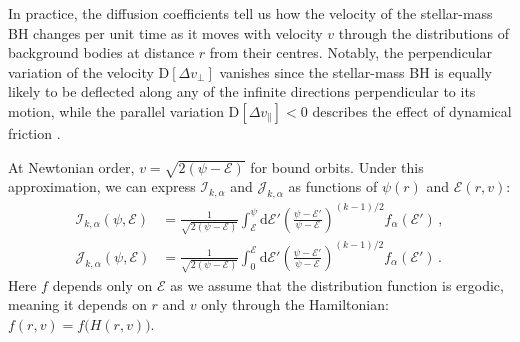 \documentclass[desactivate]{aa}
\begin{document}
\begin{appendix}
    In practice, the diffusion coefficients tell us how the velocity of the stellar-mass BH changes per unit time as it moves with velocity $v$ through the distributions of background bodies at distance $r$ from their centres. Notably, the perpendicular variation of the velocity $\mathrm{D}\left[\Delta v_\perp\right]$ vanishes since the stellar-mass BH is equally likely to be deflected along any of the infinite directions perpendicular to its motion, while the parallel variation $\mathrm{D}\left[\Delta v_\parallel\right] < 0$ describes the effect of dynamical friction \citep{1943ApJ....97..255C}.

    At Newtonian order, $v = \sqrt{2 (\psi - \mathcal{E})}$ for bound orbits. Under this approximation, we can express $\mathcal{I}_{k,\alpha}$ and $\mathcal{J}_{k,\alpha}$ as functions of $\psi(r)$ and $\mathcal{E}(r,v)$:
    \begin{align}
        \mathcal{I}_{k,\alpha} (\psi, \mathcal{E}) &= \frac{1}{\sqrt{2(\psi-\mathcal{E})}} \int_\mathcal{E}^\psi \mathrm{d}\mathcal{E'} \left(\frac{\psi-\mathcal{E'}}{\psi-\mathcal{E}}\right)^{(k-1)/2} f_\alpha (\mathcal{E'}) \, , \\
        \mathcal{J}_{k,\alpha} (\psi, \mathcal{E}) &= \frac{1}{\sqrt{2(\psi-\mathcal{E})}} \int_0^\mathcal{E} \mathrm{d}\mathcal{E'} \left(\frac{\psi-\mathcal{E'}}{\psi-\mathcal{E}}\right)^{(k-1)/2} f_\alpha (\mathcal{E'}) \, .
    \end{align}
    Here $f$ depends only on $\mathcal{E}$ as we assume that the distribution function is ergodic, meaning it depends on $r$ and $v$ only through the Hamiltonian: $f(r,v)=f \big( H(r,v) \big)$.


\end{appendix}
\end{document}
